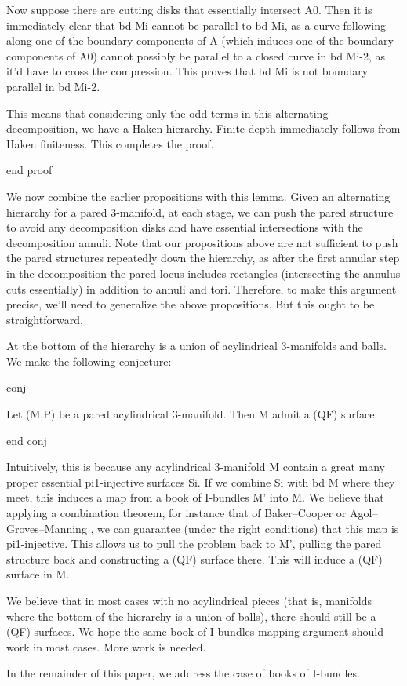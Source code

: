 Now suppose there are cutting disks that essentially intersect A0. Then it is
immediately clear that bd Mi cannot be parallel to bd Mi, as a curve following
along one of the boundary components of A (which induces one of the boundary
components of A0) cannot possibly be parallel to a closed curve in bd Mi-2, as
it'd have to cross the compression. This proves that bd Mi is not boundary
parallel in bd Mi-2.

This means that considering only the odd terms in this alternating
decomposition, we have a Haken hierarchy. Finite depth immediately follows from
Haken finiteness. This completes the proof.

end proof

We now combine the earlier propositions with this lemma. Given an alternating
hierarchy for a pared 3-manifold, at each stage, we can push the pared
structure to avoid any decomposition disks and have essential intersections
with the decomposition annuli. Note that our propositions above are not
sufficient to push the pared structures repeatedly down the hierarchy, as after
the first annular step in the decomposition the pared locus includes rectangles
(intersecting the annulus cuts essentially) in addition to annuli and tori.
Therefore, to make this argument precise, we'll need to generalize the above
propositions. But this ought to be straightforward.

At the bottom of the hierarchy is a union of acylindrical 3-manifolds and
balls. We make the following conjecture:

conj

Let (M,P) be a pared acylindrical 3-manifold. Then M admit a (QF) surface.

end conj

Intuitively, this is because any acylindrical 3-manifold M contain a great many
proper essential pi1-injective surfaces Si. If we combine Si with bd M where
they meet, this induces a map from a book of I-bundles M' into M. We believe
that applying a combination theorem, for instance that of Baker--Cooper
\cite{BCcombination} or Agol--Groves--Manning \cite{AGMcombination}, we can
guarantee (under the right conditions) that this map is pi1-injective. This
allows us to pull the problem back to M', pulling the pared structure back and
constructing a (QF) surface there. This will induce a (QF) surface in M.

We believe that in most cases with no acylindrical pieces (that is, manifolds
where the bottom of the hierarchy is a union of balls), there should still be
a (QF) surfaces. We hope the same book of I-bundles mapping argument should
work in most cases. More work is needed.

In the remainder of this paper, we address the case of books of I-bundles.
